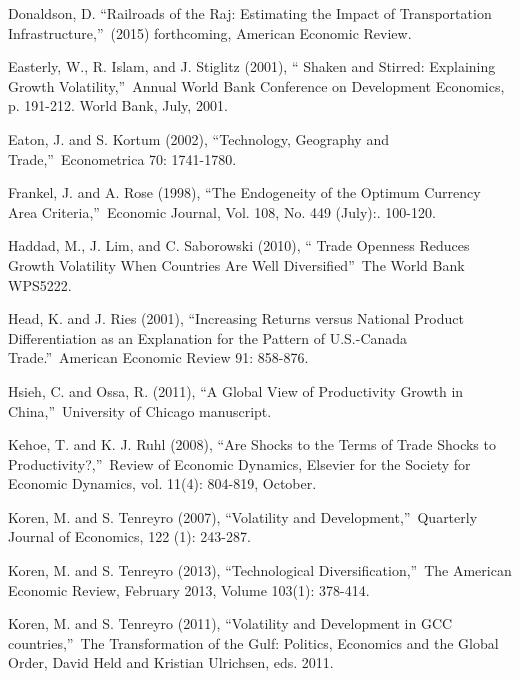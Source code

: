 \documentclass[12pt]{article}
\begin{document}
\begin{thebibliography}{99}
\bibitem{} Donaldson, D. \textquotedblleft Railroads of the Raj: Estimating
the Impact of Transportation Infrastructure,\textquotedblright\ (2015)
forthcoming, American Economic Review.

\bibitem{} Easterly, W., R. Islam, and J. Stiglitz (2001), \textquotedblleft
Shaken and Stirred: Explaining Growth Volatility,\textquotedblright\ Annual
World Bank Conference on Development Economics, p. 191-212. World Bank,
July, 2001.

\bibitem{} Eaton, J. and S. Kortum (2002), \textquotedblleft Technology,
Geography and Trade,\textquotedblright\ Econometrica 70: 1741-1780.

\bibitem{} Frankel, J. and A. Rose (1998), \textquotedblleft The Endogeneity
of the Optimum Currency Area Criteria,\textquotedblright\ Economic Journal,
Vol. 108, No. 449 (July):. 100-120.

\bibitem{} Haddad, M., J. Lim, and C. Saborowski (2010), \textquotedblleft
Trade Openness Reduces Growth Volatility When Countries Are Well
Diversified\textquotedblright\ The World Bank WPS5222.

\bibitem{} Head, K. and J. Ries (2001), \textquotedblleft Increasing Returns
versus National Product Differentiation as an Explanation for the Pattern of
U.S.-Canada Trade.\textquotedblright\ American Economic Review 91: 858-876.

\bibitem{} Hsieh, C. and Ossa, R. (2011), \textquotedblleft A Global View of
Productivity Growth in China,\textquotedblright\ University of Chicago
manuscript.

\bibitem{} Kehoe, T. and K. J. Ruhl (2008), \textquotedblleft Are Shocks to
the Terms of Trade Shocks to Productivity?,\textquotedblright\ Review of
Economic Dynamics, Elsevier for the Society for Economic Dynamics, vol.
11(4): 804-819, October.

\bibitem{} Koren, M. and S. Tenreyro (2007), \textquotedblleft Volatility
and Development,\textquotedblright\ Quarterly Journal of Economics, 122 (1):
243-287.

\bibitem{} Koren, M. and S. Tenreyro (2013), \textquotedblleft Technological
Diversification,\textquotedblright\ The American Economic Review, February
2013, Volume 103(1): 378-414.

\bibitem{} Koren, M. and S. Tenreyro (2011), \textquotedblleft Volatility
and Development in GCC countries,\textquotedblright\ The Transformation of
the Gulf: Politics, Economics and the Global Order, David Held and Kristian
Ulrichsen, eds. 2011.


\end{thebibliography}
\end{document}
